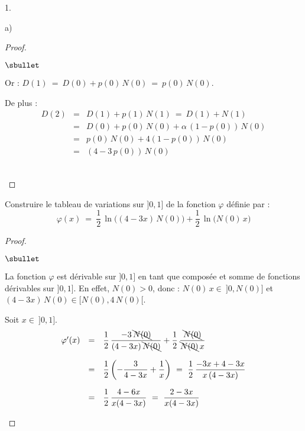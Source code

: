\documentclass[11pt]{article}%
\begin{document}
\begin{noliste}{1.}
\begin{noliste}{a)}
\begin{proof}
\begin{noliste}{$\sbullet$}
	\item Or : $D(1) \ = \ D(0) + p(0) \, N(0) \ = \ p(0) \, N(0)$.
	
	\item De plus : 
	\[
	  \begin{array}{rcl}
	    D(2) &=& D(1) + p(1) \, N(1) \ = \ D(1) + N(1)
	    \\[.2cm]
	    &=& D(0) + p(0) \, N(0) + \alpha \, (1-p(0)) \, N(0)
	    \\[.2cm]
	    &=& p(0) \, N(0) + 4(1-p(0)) \, N(0)
	    \\[.2cm]
	    &=& (4-3 \, p(0)) \, N(0)
	  \end{array}
	\]
      \end{noliste}
      ~\\[-1cm]
    \end{proof}
    
    

    
    \item Construire le tableau de variations sur $]0,1]$ de la 
    fonction $\varphi$ définie par :
    \[
      \varphi(x) \ = \ \dfrac{1}{2} \, \ln\big((4-3x) \, N(0)\big) 
      + \dfrac{1}{2} \, \ln\big(N(0) \, x\big)
    \]
    
    \begin{proof}~
      \begin{noliste}{$\sbullet$}
	\item La fonction $\varphi$ est dérivable sur $]0,1]$ en tant 
	que composée et somme de fonctions dérivables sur $]0,1]$. 
	En effet, $N(0) >0$, donc : $N(0) \, x \in \ ]0,N(0)]$ et 
	$(4-3x) \, N(0) \in [N(0), 4 \, N(0)[$.

	
	\item Soit $x \in \ ]0,1]$.
	\[
	  \begin{array}{rcl}
	    \varphi'(x) &=& \dfrac{1}{2} \, \dfrac{-3 \, \bcancel{N(0)}}
	    {(4-3x) \, \bcancel{N(0)}} + \dfrac{1}{2} \, 
	    \dfrac{\bcancel{N(0)}}{\bcancel{N(0)} \, x}
	    \\[.6cm]
	    &=& \dfrac{1}{2} \left( - \dfrac{3}{4-3x} + \dfrac{1}{x}
	    \right) \ = \ \dfrac{1}{2} \, \dfrac{-3x+4-3x}{x \, 
	    (4-3x)}
	    \\[.6cm]
	    &=& \dfrac{1}{2} \, \dfrac{4-6x}{x(4-3x)} \ = \ 
	    \dfrac{2-3x}{x(4-3x)}
	  \end{array}
	\]
	

\end{noliste}
\end{proof}
\end{noliste}
\end{noliste}
\end{document}
